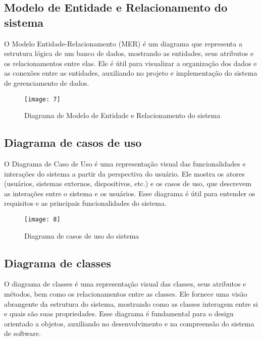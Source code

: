 \subsection{Modelo de Entidade e Relacionamento do sistema}

O Modelo Entidade-Relacionamento (MER) \cite{26} é um diagrama que representa a estrutura lógica de um banco de dados, mostrando as entidades, seus atributos e os relacionamentos entre elas. Ele é útil para visualizar a organização dos dados e as conexões entre as entidades, auxiliando no projeto e implementação do sistema de gerenciamento de dados.

\begin{figure}[h]
  \caption{Diagrama de Modelo de Entidade e Relacionamento do sistema}
  \centering
  \texttt{[image: 7]}
  \label{fig:7}
\end{figure}
\FloatBarrier

\clearpage
\subsection{Diagrama de casos de uso}

O Diagrama de Caso de Uso \cite{27} é uma representação visual das funcionalidades e interações do sistema a partir da perspectiva do usuário. Ele mostra os atores (usuários, sistemas externos, dispositivos, etc.) e os casos de uso, que descrevem as interações entre o sistema e os usuários. Esse diagrama é útil para entender os requisitos e as principais funcionalidades do sistema.

\begin{figure}[h]
  \caption{Diagrama de casos de uso do sistema}
  \centering
  \texttt{[image: 8]}
  \label{fig:8}
\end{figure}
\FloatBarrier

\clearpage
\subsection{Diagrama de classes}

O diagrama de classes \cite{27} é uma representação visual das classes, seus atributos e métodos, bem como os relacionamentos entre as classes. Ele fornece uma visão abrangente da estrutura do sistema, mostrando como as classes interagem entre si e quais são suas propriedades. Esse diagrama é fundamental para o design orientado a objetos, auxiliando no desenvolvimento e na compreensão do sistema de software.

